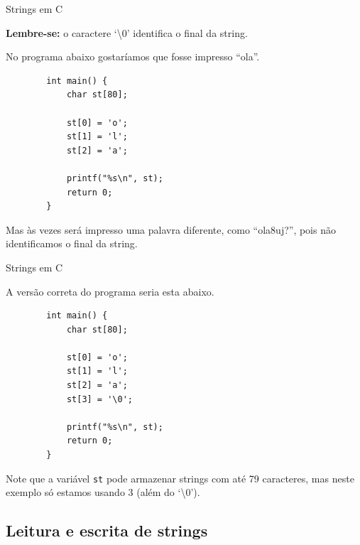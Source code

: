 \documentclass[handout]{beamer}
\newcommand{\cod}[1]{\texttt{#1}}
\begin{document}
\begin{frame}[fragile]{Strings em C}

    {\bf Lembre-se:} o caractere `\textbackslash0' identifica o final da string.

    No programa abaixo gostaríamos que fosse impresso ``ola''.

    \begin{verbatim}
        int main() {
            char st[80];

            st[0] = 'o';
            st[1] = 'l';
            st[2] = 'a';

            printf("%s\n", st);
            return 0;
        }
    \end{verbatim}

    Mas às vezes será impresso uma palavra diferente, como ``ola8uj?'', pois não identificamos o final da string.

\end{frame}

\begin{frame}[fragile]{Strings em C}

    A versão correta do programa seria esta abaixo.

    \begin{verbatim}
        int main() {
            char st[80];

            st[0] = 'o';
            st[1] = 'l';
            st[2] = 'a';
            st[3] = '\0';

            printf("%s\n", st);
            return 0;
        }
    \end{verbatim}
        
    Note que a variável \cod{st} pode armazenar strings com até 79 caracteres, mas neste exemplo só estamos usando 3 (além do `\textbackslash0').

\end{frame}


\subsection{Leitura e escrita de strings}
\end{document}
